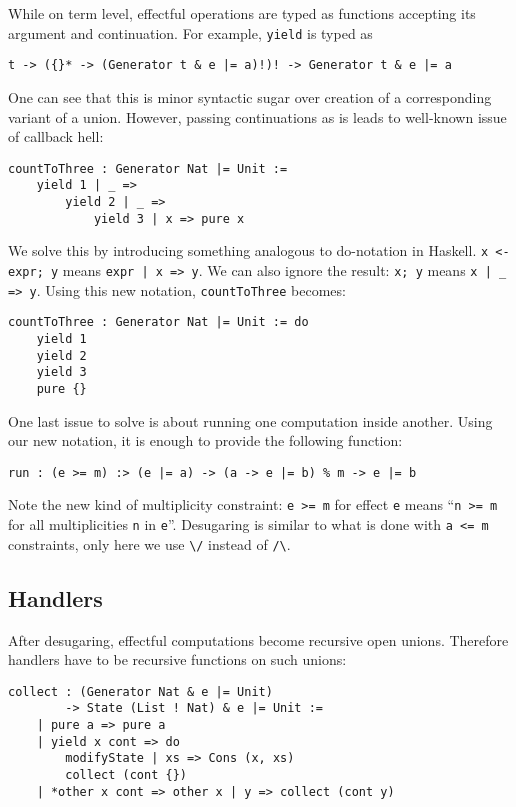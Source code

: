 \documentclass[a4paper,14pt]{extreport}
\begin{document}
While on term level, effectful operations are typed as functions accepting its
argument and continuation. For example, \verb|yield| is typed as

\begin{verbatim}
t -> ({}* -> (Generator t & e |= a)!)! -> Generator t & e |= a
\end{verbatim}

One can see that this is minor syntactic sugar over creation of a corresponding
variant of a union. However, passing continuations as is leads to well-known
issue of callback hell:

\begin{verbatim}
countToThree : Generator Nat |= Unit :=
    yield 1 | _ =>
        yield 2 | _ =>
            yield 3 | x => pure x
\end{verbatim}

We solve this by introducing something analogous to do-notation in Haskell.
\verb|x <- expr; y| means \verb+expr | x => y+. We can also ignore the result:
\verb|x; y| means \verb+x | _ => y+. Using this new notation,
\verb|countToThree| becomes:

\begin{verbatim}
countToThree : Generator Nat |= Unit := do
    yield 1
    yield 2
    yield 3
    pure {}
\end{verbatim}

One last issue to solve is about running one computation inside another. Using
our new notation, it is enough to provide the following function:

\begin{verbatim}
run : (e >= m) :> (e |= a) -> (a -> e |= b) % m -> e |= b
\end{verbatim}

Note the new kind of multiplicity constraint: \verb|e >= m| for effect \verb|e|
means ``\verb|n >= m| for all multiplicities \verb|n| in \verb|e|''. Desugaring
is similar to what is done with \verb|a <= m| constraints, only here we use
\verb|\/| instead of \verb|/\|.

\subsection{Handlers}

After desugaring, effectful computations become recursive open unions. Therefore
handlers have to be recursive functions on such unions:

\begin{verbatim}
collect : (Generator Nat & e |= Unit)
        -> State (List ! Nat) & e |= Unit :=
    | pure a => pure a
    | yield x cont => do
        modifyState | xs => Cons (x, xs)
        collect (cont {})
    | *other x cont => other x | y => collect (cont y)
\end{verbatim}
\end{document}
